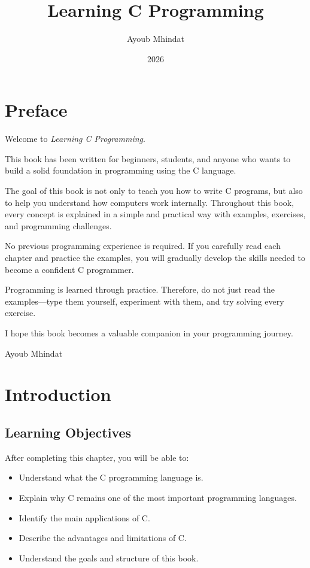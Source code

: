 \documentclass[12pt,openany]{book}
\title{Learning C Programming}
\author{Ayoub Mhindat}
\date{2026}
\begin{document}
\frontmatter
\maketitle
\chapter*{Preface}\textit{}

Welcome to \textit{Learning C Programming}.

This book has been written for beginners, students, and anyone who wants to build a solid foundation in programming using the C language.

The goal of this book is not only to teach you how to write C programs, but also to help you understand how computers work internally. Throughout this book, every concept is explained in a simple and practical way with examples, exercises, and programming challenges.

No previous programming experience is required. If you carefully read each chapter and practice the examples, you will gradually develop the skills needed to become a confident C programmer.

Programming is learned through practice. Therefore, do not just read the examples—type them yourself, experiment with them, and try solving every exercise.

I hope this book becomes a valuable companion in your programming journey.

\vspace{1cm}

\begin{flushright}
Ayoub Mhindat
\end{flushright}

\tableofcontents

\mainmatter
\chapter{Introduction}
\section{Learning Objectives}

After completing this chapter, you will be able to:

\begin{itemize}
    \item Understand what the C programming language is.
    \item Explain why C remains one of the most important programming languages.
    \item Identify the main applications of C.
    \item Describe the advantages and limitations of C.
    \item Understand the goals and structure of this book.
\end{itemize}
\end{document}
